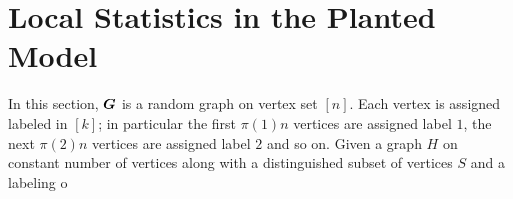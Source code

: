 \section{Local Statistics in the Planted Model}
In this section, $\boldsymbol{G}$ is a random graph on vertex set $[n]$.  Each vertex is assigned labeled in $[k]$; in particular the first $\pi(1)n$ vertices are assigned label $1$, the next $\pi(2)n$ vertices are assigned label $2$ and so on.  Given a graph $H$ on constant number of vertices along with a distinguished subset of vertices $S$ and a labeling o